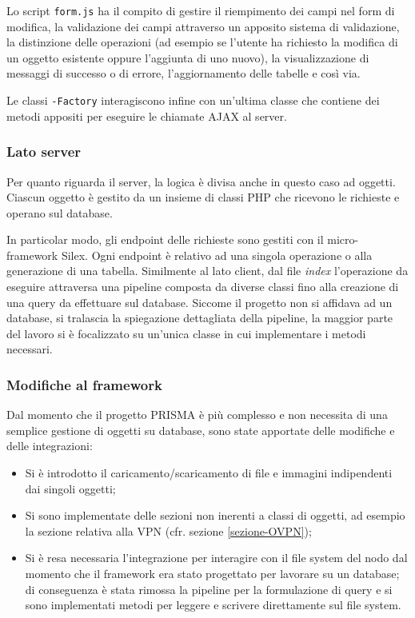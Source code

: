 Lo script \texttt{form.js} ha il compito di gestire il riempimento dei campi nel form di modifica, la validazione dei campi attraverso un apposito sistema di validazione, la distinzione delle operazioni (ad esempio se l'utente ha richiesto la modifica di un oggetto esistente oppure l'aggiunta di uno nuovo), la visualizzazione di messaggi di successo o di errore, l'aggiornamento delle tabelle e così via.

Le classi \texttt{-Factory} interagiscono infine con un'ultima classe che contiene dei metodi appositi per eseguire le chiamate AJAX al server.

\subsubsection{Lato server}

Per quanto riguarda il server, la logica è divisa anche in questo caso ad oggetti. Ciascun oggetto è gestito da un insieme di classi PHP che ricevono le richieste e operano sul database.

In particolar modo, gli endpoint delle richieste sono gestiti con il micro-framework Silex. Ogni endpoint è relativo ad una singola operazione o alla generazione di una tabella. Similmente al lato client, dal file \emph{index} l'operazione da eseguire attraversa una pipeline composta da diverse classi fino alla creazione di una query da effettuare sul database. Siccome il progetto non si affidava ad un database, si tralascia la spiegazione dettagliata della pipeline, la maggior parte del lavoro si è focalizzato su un'unica classe in cui implementare i metodi necessari.

\subsubsection{Modifiche al framework}

Dal momento che il progetto PRISMA è più complesso e non necessita di una semplice gestione di oggetti su database, sono state apportate delle modifiche e delle integrazioni:
\begin{itemize}
    \item Si è introdotto il caricamento/scaricamento di file e immagini indipendenti dai singoli oggetti;
    \item Si sono implementate delle sezioni non inerenti a classi di oggetti, ad esempio la sezione relativa alla VPN (cfr. sezione \ref{sezione-OVPN});
    \item Si è resa necessaria l'integrazione per interagire con il file system del nodo dal momento che il framework era stato progettato per lavorare su un database; di conseguenza è stata rimossa la pipeline per la formulazione di query e si sono implementati metodi per leggere e scrivere direttamente sul file system.
\end{itemize} 

